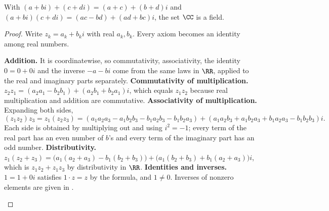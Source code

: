 \documentclass[10pt]{scrartcl}
\begin{document}
\begin{proposition*}
  With $(a+bi)+(c+di)=(a+c)+(b+d)i$ and $(a+bi)(c+di)=(ac-bd)+(ad+bc)i$, the set $\CC$ is a field.
\end{proposition*}
\begin{proof}
  Write $z_k=a_k+b_ki$ with real $a_k,b_k$. Every axiom becomes an identity among real numbers.
  \begin{steps}
    \ii \textbf{Addition.} It is coordinatewise, so commutativity, associativity, the identity $0=0+0i$ and the inverse $-a-bi$ come from the same laws in $\RR$, applied to the real and imaginary parts separately.
    \ii \textbf{Commutativity of multiplication.} $z_2z_1=(a_2a_1-b_2b_1)+(a_2b_1+b_2a_1)i$, which equals $z_1z_2$ because real multiplication and addition are commutative.
    \ii \textbf{Associativity of multiplication.} Expanding both sides,
    \[
      (z_1z_2)z_3=z_1(z_2z_3)=(a_1a_2a_3-a_1b_2b_3-b_1a_2b_3-b_1b_2a_3)+(a_1a_2b_3+a_1b_2a_3+b_1a_2a_3-b_1b_2b_3)i .
    \]
    Each side is obtained by multiplying out and using $i^2=-1$; every term of the real part has an even number of $b$'s and every term of the imaginary part has an odd number.
    \ii \textbf{Distributivity.} $z_1(z_2+z_3)=\bigl(a_1(a_2+a_3)-b_1(b_2+b_3)\bigr)+\bigl(a_1(b_2+b_3)+b_1(a_2+a_3)\bigr)i$, which is $z_1z_2+z_1z_3$ by distributivity in $\RR$.
    \ii \textbf{Identities and inverses.} $1=1+0i$ satisfies $1\cdot z=z$ by the formula, and $1\ne 0$. Inverses of nonzero elements are given in .
  \end{steps}
\end{proof}
\end{document}

